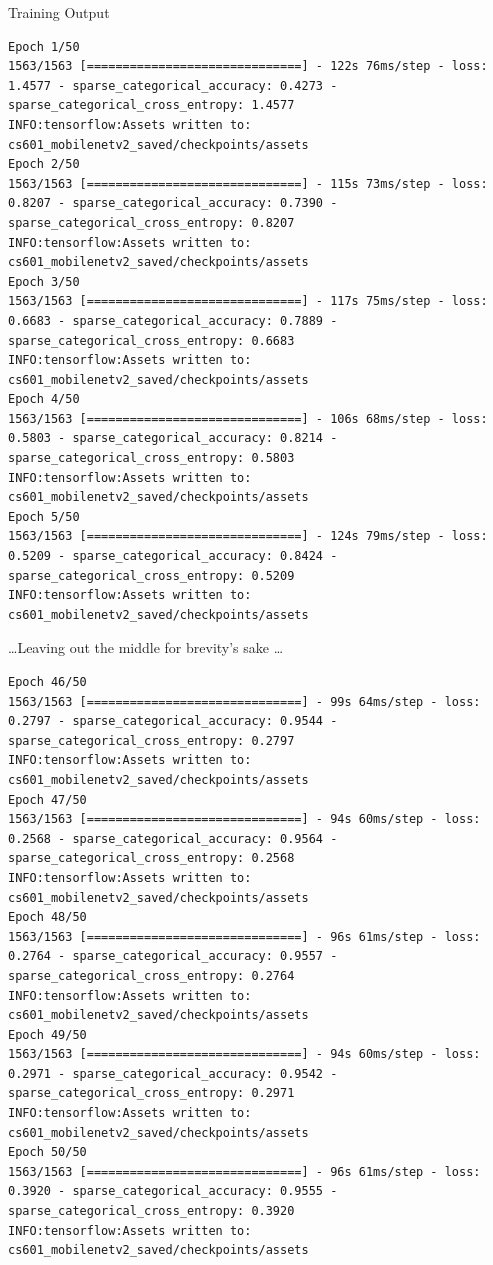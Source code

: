 \documentclass[12pt, letterpaper]{article}
\begin{document}
{\large Training Output}

\begin{mdframed}[backgroundcolor=bg]
\begin{lstlisting}
Epoch 1/50
1563/1563 [==============================] - 122s 76ms/step - loss: 1.4577 - sparse_categorical_accuracy: 0.4273 - sparse_categorical_cross_entropy: 1.4577
INFO:tensorflow:Assets written to: cs601_mobilenetv2_saved/checkpoints/assets
Epoch 2/50
1563/1563 [==============================] - 115s 73ms/step - loss: 0.8207 - sparse_categorical_accuracy: 0.7390 - sparse_categorical_cross_entropy: 0.8207
INFO:tensorflow:Assets written to: cs601_mobilenetv2_saved/checkpoints/assets
Epoch 3/50
1563/1563 [==============================] - 117s 75ms/step - loss: 0.6683 - sparse_categorical_accuracy: 0.7889 - sparse_categorical_cross_entropy: 0.6683
INFO:tensorflow:Assets written to: cs601_mobilenetv2_saved/checkpoints/assets
Epoch 4/50
1563/1563 [==============================] - 106s 68ms/step - loss: 0.5803 - sparse_categorical_accuracy: 0.8214 - sparse_categorical_cross_entropy: 0.5803
INFO:tensorflow:Assets written to: cs601_mobilenetv2_saved/checkpoints/assets
Epoch 5/50
1563/1563 [==============================] - 124s 79ms/step - loss: 0.5209 - sparse_categorical_accuracy: 0.8424 - sparse_categorical_cross_entropy: 0.5209
INFO:tensorflow:Assets written to: cs601_mobilenetv2_saved/checkpoints/assets
\end{lstlisting}
\end{mdframed}

\dots Leaving out the middle for brevity's sake \dots

\begin{mdframed}[backgroundcolor=bg]
\begin{lstlisting}
Epoch 46/50
1563/1563 [==============================] - 99s 64ms/step - loss: 0.2797 - sparse_categorical_accuracy: 0.9544 - sparse_categorical_cross_entropy: 0.2797
INFO:tensorflow:Assets written to: cs601_mobilenetv2_saved/checkpoints/assets
Epoch 47/50
1563/1563 [==============================] - 94s 60ms/step - loss: 0.2568 - sparse_categorical_accuracy: 0.9564 - sparse_categorical_cross_entropy: 0.2568
INFO:tensorflow:Assets written to: cs601_mobilenetv2_saved/checkpoints/assets
Epoch 48/50
1563/1563 [==============================] - 96s 61ms/step - loss: 0.2764 - sparse_categorical_accuracy: 0.9557 - sparse_categorical_cross_entropy: 0.2764
INFO:tensorflow:Assets written to: cs601_mobilenetv2_saved/checkpoints/assets
Epoch 49/50
1563/1563 [==============================] - 94s 60ms/step - loss: 0.2971 - sparse_categorical_accuracy: 0.9542 - sparse_categorical_cross_entropy: 0.2971
INFO:tensorflow:Assets written to: cs601_mobilenetv2_saved/checkpoints/assets
Epoch 50/50
1563/1563 [==============================] - 96s 61ms/step - loss: 0.3920 - sparse_categorical_accuracy: 0.9555 - sparse_categorical_cross_entropy: 0.3920
INFO:tensorflow:Assets written to: cs601_mobilenetv2_saved/checkpoints/assets
\end{lstlisting}
\end{mdframed}
\end{document}
